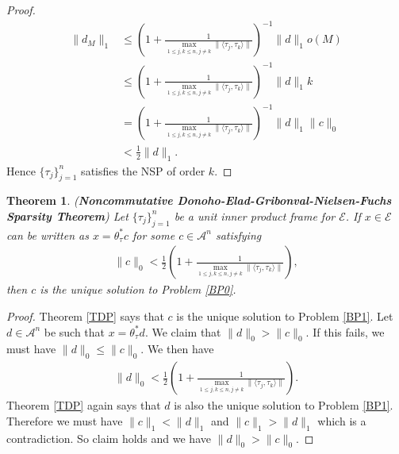 \documentclass{amsart}
\newtheorem{theorem}{Theorem}[section]
\begin{document}
\begin{proof}
\begin{align*}
\|d_M\|_1&\leq \left(1+\frac{1}{\displaystyle\max_{1\leq j, k \leq n, j\neq k}\|\langle \tau_j, \tau_k\rangle\|}\right)^{-1} \|d\|_1o(M)\\
&\leq\left(1+\frac{1}{\displaystyle\max_{1\leq j, k \leq n, j\neq k}\|\langle \tau_j, \tau_k\rangle\|}\right)^{-1} \|d\|_1k\\
&=\left(1+\frac{1}{\displaystyle\max_{1\leq j, k \leq n, j\neq k}\|\langle \tau_j, \tau_k\rangle\|}\right)^{-1} \|d\|_1\|c\|_0\\
&<\frac{1}{2}\|d\|_1.
\end{align*}
Hence 	$\{\tau_j\}_{j=1}^n $  satisfies the  NSP of order $k$.
\end{proof}
\begin{theorem} (\textbf{Noncommutative Donoho-Elad-Gribonval-Nielsen-Fuchs Sparsity Theorem})
Let  $\{\tau_j\}_{j=1}^n $  be a unit inner product frame for  $\mathcal{E}$.
If $x \in \mathcal{E}$ can be written as  $	x=\theta_\tau^* c$ for some  $c \in \mathcal{A}^n$ satisfying 
\begin{align*}
	\|c\|_0<\frac{1}{2}\left(1+\frac{1}{\displaystyle\max_{1\leq j, k \leq n, j\neq k}\|\langle \tau_j, \tau_k\rangle\|}\right),	
\end{align*}
then $c$ is the unique solution to Problem \ref{BP0}.	
\end{theorem}
\begin{proof}
Theorem \ref{TDP} says that  $c$ is the unique solution to Problem \ref{BP1}.  Let $d \in \mathcal{A}^n$ be such that 	$x=\theta_\tau^* d$. We claim that $\|d\|_0> \|c\|_0$.  If this fails, we must have $\|d\|_0\leq \|c\|_0$. We then have 
\begin{align*}
	\|d\|_0<\frac{1}{2}\left(1+\frac{1}{\displaystyle\max_{1\leq j, k \leq n, j\neq k}\|\langle \tau_j, \tau_k\rangle\|}\right).
\end{align*}
Theorem \ref{TDP} again says  that $d$ is also the unique solution to Problem \ref{BP1}. Therefore we must have  $\|c\|_1<\|d\|_1$ and $\|c\|_1>\|d\|_1$ which is a contradiction. So claim holds and we have $\|d\|_0> \|c\|_0$.
\end{proof}









 
 
 
\end{document}
